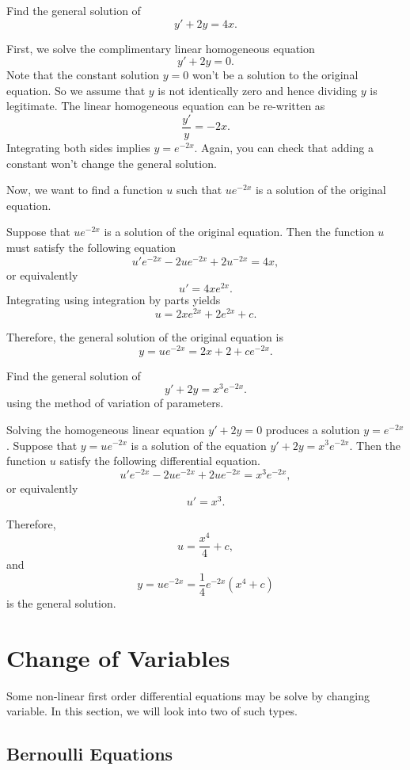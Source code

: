 \begin{example}
  Find the general solution of 
  \[  y' + 2y  = 4x. \]
\end{example}
\begin{solution}
  First, we solve the complimentary linear homogeneous equation
  \[y'+2y=0.\]
Note that the constant solution $y=0$ won't be a solution to the original equation. So we assume that $y$ is not identically zero and hence dividing $y$ is legitimate. The linear homogeneous equation can be re-written as
\[\frac{y'}{y}=-2x.\]
Integrating both sides implies $y=e^{-2x}$. Again, you can check that adding a constant won't change the general solution.

Now, we want to find a function $u$ such that $ue^{-2x}$ is a solution of the original equation.

Suppose that $ue^{-2x}$ is a solution of the original equation. Then the function $u$ must satisfy the following equation
\[u'e^{-2x}-2ue^{-2x}+2u^{-2x}=4x,\]
or equivalently
\[u'=4xe^{2x}.\]
 Integrating using integration by parts yields
 \[u=2xe^{2x}+2e^{2x}+c.\]

 Therefore, the general solution of the original equation is
 \[y=ue^{-2x}=2x+2+ce^{-2x}.\]
\end{solution}

\begin{exercise}
  Find the general solution of
\[y'+2y=x^3e^{-2x}.\]
using the method of variation of parameters.
\end{exercise}
\begin{exersol}
Solving the homogeneous linear equation $y'+2y=0$ produces a solution $y=e^{-2x}$.
Suppose that $y=ue^{-2x}$ is a solution of the equation $y'+2y=x^3e^{-2x}$. Then the function $u$ satisfy the following differential equation.
\[u'e^{-2x}-2ue^{-2x}+2ue^{-2x}=x^3e^{-2x},\]
or equivalently
\[u'=x^3.\]

Therefore,
\[u=\frac{x^4}{4}+c,\]
and
\[y=ue^{-2x}=\frac14e^{-2x}\left(x^4+c\right)\]
is the general solution.
\end{exersol}

\section{Change of Variables}

Some non-linear first order differential equations may be solve by changing variable. In this section, we will look into two of such types.

\subsection{Bernoulli Equations}

